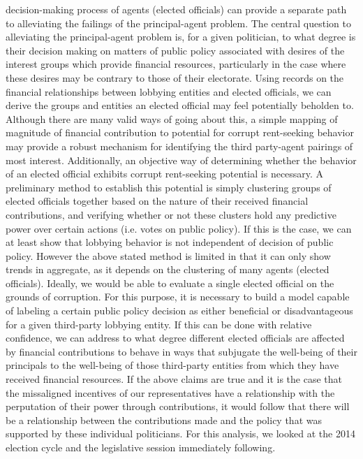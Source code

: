 \documentclass[journal]{IEEEtran}
\begin{document}
decision-making process of agents (elected officials) can provide a separate path to alleviating the failings of the 
principal-agent problem.\newline
  The central question to alleviating the principal-agent problem is, for a given politician, to what degree is their decision 
making on matters of public policy associated with desires of the interest groups which provide financial resources, particularly
in the case where these desires may be contrary to those of their electorate. Using records on the financial relationships between 
lobbying entities and elected officials, we can derive the groups and entities an elected official may feel potentially beholden 
to. Although there are many valid ways of going about this, a simple mapping of magnitude of financial contribution to potential for 
corrupt rent-seeking behavior may provide a robust mechanism for identifying the third party-agent pairings of most interest. 
Additionally, an objective way of determining whether the behavior of an elected official exhibits corrupt rent-seeking potential 
is necessary. A preliminary method to establish this potential is simply clustering groups of elected officials together based 
on the nature of their received financial contributions, and verifying whether or not these clusters hold any predictive power 
over certain actions (i.e. votes on public policy). If this is the case, we can at least show that lobbying behavior is not 
independent of decision of public policy. However the above stated method is limited in that it can only show trends in aggregate, 
as it depends on the clustering of many agents (elected officials). Ideally, we would be able to evaluate a single elected official 
on the grounds of corruption. For this purpose, it is necessary to build a model capable of labeling a certain public policy 
decision as either beneficial or disadvantageous for a given third-party lobbying entity. If this can be done with relative 
confidence, we can address to what degree different elected officials are affected by financial contributions to behave in ways 
that subjugate the well-being of their principals to the well-being of those third-party entities from which they have received 
financial resources.\newline
  If the above claims are true and it is the case that the missaligned incentives of our representatives have a relationship with the 
perputation of their power through contributions, it would follow that there will be a relationship between the contributions made
and the policy that was supported by these individual politicians. For this analysis, we looked at the 2014 election cycle and the 
legislative session immediately following.
\end{document}
